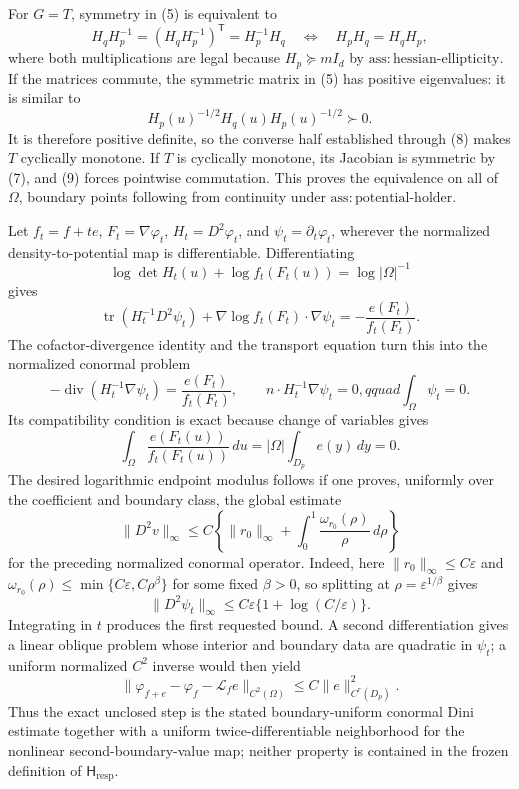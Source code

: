 For \(G=T\), symmetry in (5) is equivalent to
\[
 H_qH_p^{-1}=(H_qH_p^{-1})^{\mathsf T}=H_p^{-1}H_q
 \quad\Longleftrightarrow\quad
 H_pH_q=H_qH_p,
 \tag{9}
\]
where both multiplications are legal because \(H_p\succeq mI_d\) by \(\mathrm{ass:hessian\text{-}ellipticity}\).  If the matrices commute, the symmetric matrix in (5) has positive eigenvalues: it is similar to
\[
 H_p(u)^{-1/2}H_q(u)H_p(u)^{-1/2}\succ0.
\]
It is therefore positive definite, so the converse half established through (8) makes \(T\) cyclically monotone.  If \(T\) is cyclically monotone, its Jacobian is symmetric by (7), and (9) forces pointwise commutation.  This proves the equivalence on all of \(\Omega\), boundary points following from continuity under \(\mathrm{ass:potential\text{-}holder}\).

Let \(f_t=f+te\), \(F_t=\nabla\varphi_t\), \(H_t=D^2\varphi_t\), and \(\psi_t=\partial_t\varphi_t\), wherever the normalized density-to-potential map is differentiable.  Differentiating
\[
 \log\det H_t(u)+\log f_t(F_t(u))=\log\lvert\Omega\rvert^{-1}
\]
gives
\[
 \operatorname{tr}(H_t^{-1}D^2\psi_t)
 +\nabla\log f_t(F_t)\cdot\nabla\psi_t
 =-\frac{e(F_t)}{f_t(F_t)}.
\]
The cofactor-divergence identity and the transport equation turn this into the normalized conormal problem
\[
 -\operatorname{div}(H_t^{-1}\nabla\psi_t)
 =\frac{e(F_t)}{f_t(F_t)},\qquad
 n\cdot H_t^{-1}\nabla\psi_t=0,qquad
 \int_\Omega\psi_t=0.
\]
Its compatibility condition is exact because change of variables gives
\[
 \int_\Omega\frac{e(F_t(u))}{f_t(F_t(u))}\,du
 =\lvert\Omega\rvert\int_{D_p}e(y)\,dy=0.
\]
The desired logarithmic endpoint modulus follows if one proves, uniformly over the coefficient and boundary class, the global estimate
\[
 \lVert D^2v\rVert_\infty
 \le C\left\{\lVert r_0\rVert_\infty+
 \int_0^1\frac{\omega_{r_0}(\rho)}{\rho}\,d\rho\right\}
\]
for the preceding normalized conormal operator.  Indeed, here
\(\lVert r_0\rVert_\infty\le C\varepsilon\) and
\(\omega_{r_0}(\rho)\le\min\{C\varepsilon,C\rho^\beta\}\) for some fixed \(\beta>0\), so splitting at \(\rho=\varepsilon^{1/\beta}\) gives
\[
 \lVert D^2\psi_t\rVert_\infty
 \le C\varepsilon\{1+\log(C/\varepsilon)\}.
\]
Integrating in \(t\) produces the first requested bound.  A second differentiation gives a linear oblique problem whose interior and boundary data are quadratic in \(\psi_t\); a uniform normalized \(C^2\) inverse would then yield
\[
 \lVert\varphi_{f+e}-\varphi_f-\mathscr L_fe\rVert_{C^2(\Omega)}
 \le C\lVert e\rVert_{C^r(D_p)}^2.
\]
Thus the exact unclosed step is the stated boundary-uniform conormal Dini estimate together with a uniform twice-differentiable neighborhood for the nonlinear second-boundary-value map; neither property is contained in the frozen definition of \(\mathsf H_{\mathrm{resp}}\).

